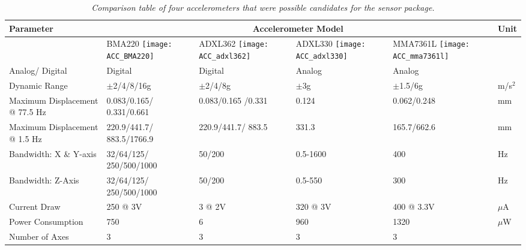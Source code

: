 \begin{table}[H]
    \begin{tabular}{|p{2.5cm}|p{2.5cm}|p{2.5cm}|p{2.5cm}|p{2.5cm}|p{2.5cm}|}
    \hline
    \textbf{Parameter} & \multicolumn{4}{c|}{\textbf{Accelerometer Model}}& \textbf{Unit} \\
    \hline
            & BMA220 \texttt{[image: ACC\_BMA220]}    & ADXL362  \texttt{[image: ACC\_adxl362]}  & ADXL330  \texttt{[image: ACC\_adxl330]} & MMA7361L \texttt{[image: ACC\_mma7361l]} &  \\ \hline
    Analog/ {Digital}            & Digital                   & Digital            & Analog      & Analog        & ~ \\ \hline
    Dynamic Range              & $\pm$2/4/8/16g            & $\pm$2/4/8g         & $\pm$3g     & $\pm$1.5/6g   & m/s$^2$ \\ \hline
    Maximum Displacement @ 77.5 Hz & 0.083/0.165/ 0.331/0.661   & 0.083/0.165 /0.331   & 0.124       & 0.062/0.248   & mm    \\ \hline
    Maximum Displacement @ 1.5 Hz  & 220.9/441.7/ 883.5/1766.9  & 220.9/441.7/ 883.5   & 331.3       & 165.7/662.6   & mm    \\ \hline
    Bandwidth: X \& Y-axis               & 32/64/125/ 250/500/1000    & 50/200              & 0.5-1600    & 400           & Hz    \\ \hline
    Bandwidth: Z-Axis                     & 32/64/125/ 250/500/1000   & 50/200              & 0.5-550     & 300           & Hz    \\ \hline
    Current Draw               & 250 @ 3V           	   & 3 @ 2V   		     & 320 @ 3V    & 400 @ 3.3V    & $\mu$A     \\ \hline
    Power Consumption          & 750                       & 6                   & 960         & 1320          & $\mu$W    \\ \hline
    Number of Axes             & 3                         & 3                   & 3           & 3             & ~     \\ \hline
    \end{tabular}
    \caption{\textit{Comparison table of four accelerometers that were possible candidates for the sensor package.}}
\label{Acc_Comp_Table}
\end{table}
